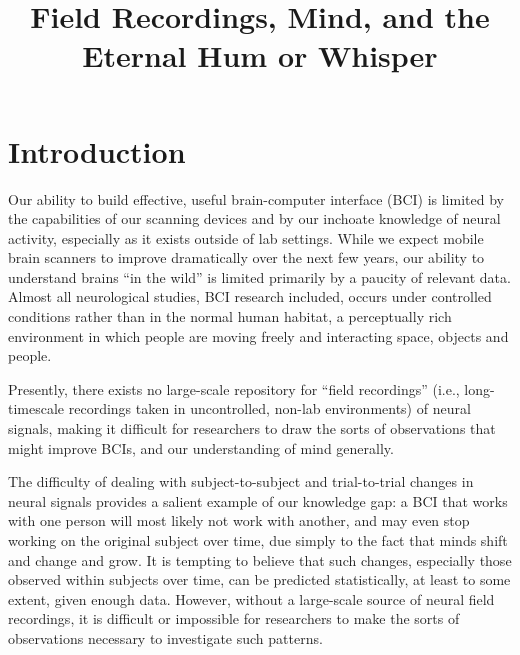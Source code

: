 \documentclass[a4paper,twoside]{article}
\begin{document}
\title{Field Recordings, Mind, and the Eternal Hum or Whisper}

\author{
}






\onecolumn \maketitle \normalsize \vfill




\section{Introduction}

Our ability to build effective, useful brain-computer interface (BCI) is limited by the capabilities of our scanning devices and by our inchoate knowledge of neural activity, especially as it exists outside of lab settings. While we expect mobile brain scanners to improve dramatically over the next few years, our ability to understand brains ``in the wild'' is limited primarily by a paucity of relevant data. Almost all neurological studies, BCI research included, occurs under controlled conditions rather than in the normal human habitat, a perceptually rich environment in which people are moving freely and interacting space, objects and people.

Presently, there exists no large-scale repository for ``field recordings'' (i.e., long-timescale recordings taken in uncontrolled, non-lab environments) of neural signals, making it difficult for researchers to draw the sorts of observations that might improve BCIs, and our understanding of mind generally.

The difficulty of dealing with subject-to-subject and trial-to-trial changes in neural signals provides a salient example of our knowledge gap: a BCI that works with one person will most likely not work with another, and may even stop working on the original subject over time, due simply to the fact that minds shift and change and grow. It is tempting to believe that such changes, especially those observed within subjects over time, can be predicted statistically, at least to some extent, given enough data. However, without a large-scale source of neural field recordings, it is difficult or impossible for researchers to make the sorts of observations necessary to investigate such patterns.
\end{document}
